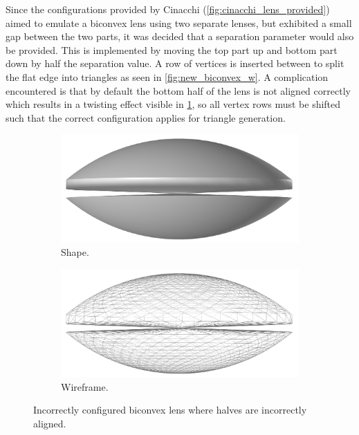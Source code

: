 Since the configurations provided by Cinacchi (\cref{fig:cinacchi_lens_provided}) aimed to emulate a biconvex lens using two separate lenses, but exhibited a small gap between the two parts, it was decided that a separation parameter would also be provided. This is implemented by moving the top part up and bottom part down by half the separation value. A row of vertices is inserted between to split the flat edge into triangles as seen in \cref{fig:new_biconvex_w}. A complication encountered is that by default the bottom half of the lens is not aligned correctly which results in a twisting effect visible in \cref{fig:bad_biconvex}, so all vertex rows must be shifted such that the correct configuration applies for triangle generation.
\begin{figure}
\begin{center}
    \begin{subfigure}{0.4\textwidth}
      \includegraphics[width=\textwidth]{assets/images/shapes/bugnew/bicon}
      \caption{Shape.}
    \end{subfigure}
        \begin{subfigure}{0.4\textwidth}
      \includegraphics[width=\textwidth]{assets/images/shapes/bugnew/bicon_w}
      \caption{Wireframe.}
    \end{subfigure}
    \end{center}
  \caption{Incorrectly configured biconvex lens where halves are incorrectly aligned.}
  \label{fig:bad_biconvex}
\end{figure}


